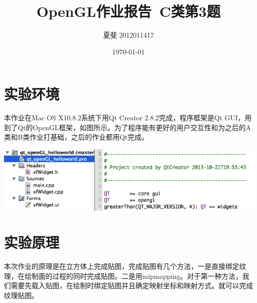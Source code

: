 \documentclass[12pt]{article}
\title{OpenGL作业报告\  C类第3题}
\author{夏斐 2012011417}
\date{\today}
\begin{document}
\maketitle
\linespread {1}
\section{实验环境}
本作业在Mac OS X10.8.2系统下用Qt Creator 2.8.2完成，程序框架是Qt GUI，用到了Qt的OpenGL框架，如图所示。为了程序能有更好的用户交互性和为之后的A类和B类作业打基础，之后的作业都用Qt完成。
\begin{center}
\includegraphics[width = 6in]{environment.png} 
\end{center}
\par
\section{实验原理}
本次作业的原理是在立方体上完成贴图，完成贴图有几个方法，一是直接绑定纹理，在绘制面的过程的同时完成贴图。二是用mipmapping。对于第一种方法，我们需要先载入贴图，在绘制时绑定贴图并且确定映射坐标和映射方式。就可以完成纹理贴图。
\end{document}
